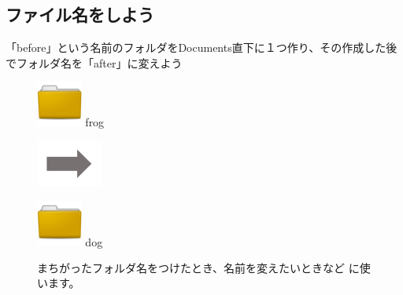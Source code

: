 \documentclass[a4paper,12pt]{jarticle}
\begin{document}
\clearpage
{}
\subsection{\theExercise ファイル名をしよう}
「before」という名前のフォルダをDocuments直下に１つ作り、その作成した後でフォルダ名を「after」に変えよう

\begin{figure}[ht]

  \centering
  \begin{minipage}{1.978cm}
    \includegraphics[width=1.5cm]{textbook-img044.png}
    frog
  \end{minipage}
  \includegraphics[width=2.168cm]{textbook-img052.png}
  \begin{minipage}{1.978cm}
    \includegraphics[width=1.5cm]{textbook-img044.png}
    dog
  \end{minipage}
  \begin{minipage}{6.319cm}
    まちがったフォルダ名をつけたとき、名前を変えたいときなど
    に使います。
  \end{minipage}


\end{figure}
\end{document}
